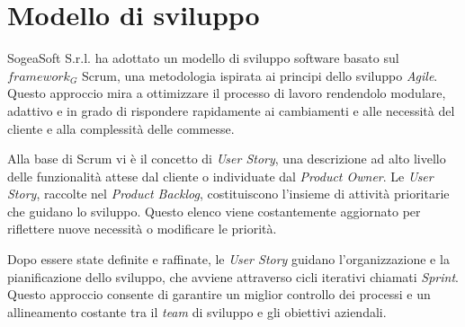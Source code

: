    \section{Modello di sviluppo}
    SogeaSoft S.r.l. ha adottato un modello di sviluppo software basato sul \textit{$framework_G$} Scrum, una metodologia ispirata ai principi dello sviluppo \textit{Agile}. Questo approccio mira a ottimizzare il processo di lavoro rendendolo modulare, adattivo e in grado di rispondere rapidamente ai cambiamenti e alle necessità del cliente e alla complessità delle commesse.  
    
    \noindent Alla base di Scrum vi è il concetto di \textit{User Story}, una descrizione ad alto livello delle funzionalità attese dal cliente o individuate dal \textit{Product Owner}. Le \textit{User Story}, raccolte nel \textit{Product Backlog}, costituiscono l'insieme di attività prioritarie che guidano lo sviluppo. Questo elenco viene costantemente aggiornato per riflettere nuove necessità o modificare le priorità.
    
    \noindent Dopo essere state definite e raffinate, le \textit{User Story} guidano l'organizzazione e la pianificazione dello sviluppo, che avviene attraverso cicli iterativi chiamati \textit{Sprint}. Questo approccio consente di garantire un miglior controllo dei processi e un allineamento costante tra il \textit{team} di sviluppo e gli obiettivi aziendali. 


